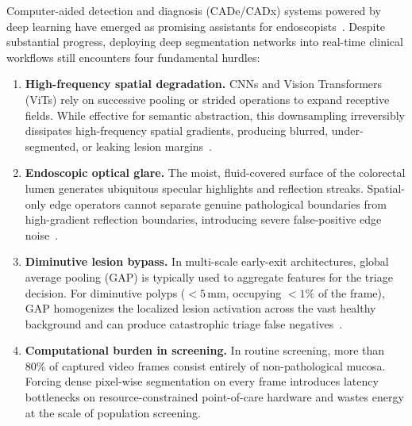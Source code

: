 \documentclass[journal]{IEEEtran}
\begin{document}
Computer-aided detection and diagnosis (CADe/CADx) systems powered by deep learning have emerged as promising assistants for endoscopists~\cite{fan2020pranet,ma2024medsam}. Despite substantial progress, deploying deep segmentation networks into real-time clinical workflows still encounters four fundamental hurdles:
\begin{enumerate}
    \item \textbf{High-frequency spatial degradation.} CNNs and Vision Transformers (ViTs) rely on successive pooling or strided operations to expand receptive fields. While effective for semantic abstraction, this downsampling irreversibly dissipates high-frequency spatial gradients, producing blurred, under-segmented, or leaking lesion margins~\cite{chen2021transunet,ruan2024vmunet}.
    \item \textbf{Endoscopic optical glare.} The moist, fluid-covered surface of the colorectal lumen generates ubiquitous specular highlights and reflection streaks. Spatial-only edge operators cannot separate genuine pathological boundaries from high-gradient reflection boundaries, introducing severe false-positive edge noise~\cite{zhou2019unetplusplus}.
    \item \textbf{Diminutive lesion bypass.} In multi-scale early-exit architectures, global average pooling (GAP) is typically used to aggregate features for the triage decision. For diminutive polyps ($<5$\,mm, occupying $<1\%$ of the frame), GAP homogenizes the localized lesion activation across the vast healthy background and can produce catastrophic triage false negatives~\cite{angelopoulos2022crc}.
    \item \textbf{Computational burden in screening.} In routine screening, more than 80\% of captured video frames consist entirely of non-pathological mucosa. Forcing dense pixel-wise segmentation on every frame introduces latency bottlenecks on resource-constrained point-of-care hardware and wastes energy at the scale of population screening.
\end{enumerate}
\end{document}
